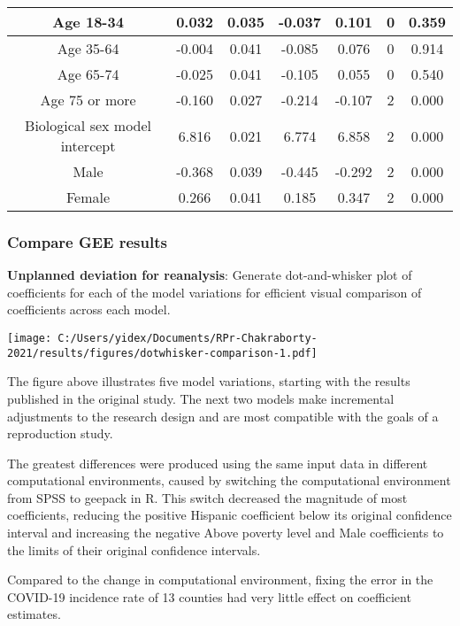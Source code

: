 \documentclass[
]{article}
\begin{document}
\begin{table}
\begin{tabular}[t]{c|c|c|c|c|c|c}
\hline
Age 18-34 & 0.032 & 0.035 & -0.037 & 0.101 & 0 & 0.359\\
\hline
Age 35-64 & -0.004 & 0.041 & -0.085 & 0.076 & 0 & 0.914\\
\hline
Age 65-74 & -0.025 & 0.041 & -0.105 & 0.055 & 0 & 0.540\\
\hline
Age 75 or more & -0.160 & 0.027 & -0.214 & -0.107 & 2 & 0.000\\
\hline
Biological sex model intercept & 6.816 & 0.021 & 6.774 & 6.858 & 2 & 0.000\\
\hline
Male & -0.368 & 0.039 & -0.445 & -0.292 & 2 & 0.000\\
\hline
Female & 0.266 & 0.041 & 0.185 & 0.347 & 2 & 0.000\\
\hline
\end{tabular}
\end{table}

\hypertarget{compare-gee-results}{%
\subsubsection{Compare GEE results}\label{compare-gee-results}}

\textbf{Unplanned deviation for reanalysis}: Generate dot-and-whisker
plot of coefficients for each of the model variations for efficient
visual comparison of coefficients across each model.

\texttt{[image: C:/Users/yidex/Documents/RPr-Chakraborty-2021/results/figures/dotwhisker-comparison-1.pdf]}

The figure above illustrates five model variations, starting with the
results published in the original study. The next two models make
incremental adjustments to the research design and are most compatible
with the goals of a reproduction study.

The greatest differences were produced using the same input data in
different computational environments, caused by switching the
computational environment from SPSS to geepack in R. This switch
decreased the magnitude of most coefficients, reducing the positive
Hispanic coefficient below its original confidence interval and
increasing the negative Above poverty level and Male coefficients to the
limits of their original confidence intervals.

Compared to the change in computational environment, fixing the error in
the COVID-19 incidence rate of 13 counties had very little effect on
coefficient estimates.
\end{document}
